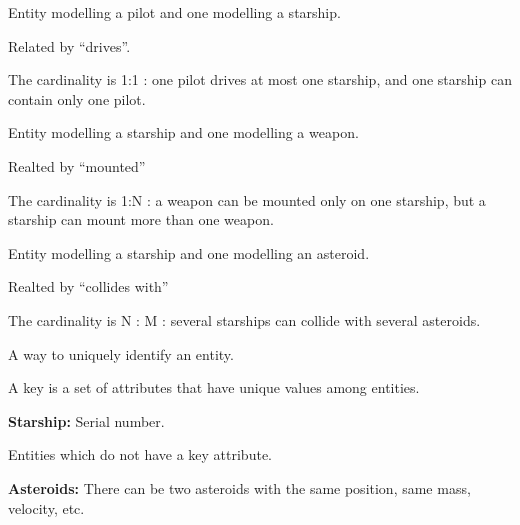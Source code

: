 \documentclass{beamer}
\begin{document}
\begin{slide}{
\item Entity modelling a pilot and one modelling a starship.
\item Related by ``drives''.
\item The cardinality is 1:1 : one pilot drives at most one starship, and one starship can contain only one pilot.

}\end{slide}

\begin{slide}{
\item Entity modelling a starship and one modelling a weapon.
\item Realted by ``mounted''
\item The cardinality is 1:N : a weapon can be mounted only on one starship, but a starship can mount more than one weapon.

}\end{slide}

\begin{slide}{
\item Entity modelling a starship and one modelling an asteroid.
\item Realted by ``collides with''
\item The cardinality is N : M : several starships can collide with several asteroids.

}\end{slide}

\begin{slide}{
\item A way to uniquely identify an entity.
\item A key is a set of attributes that have unique values among entities.
\item \textbf{Starship:} Serial number.

}\end{slide}

\begin{slide}{
\item Entities which do not have a key attribute.
\item \textbf{Asteroids:} There can be two asteroids with the same position, same mass, velocity, etc.

}\end{slide}
\end{document}
